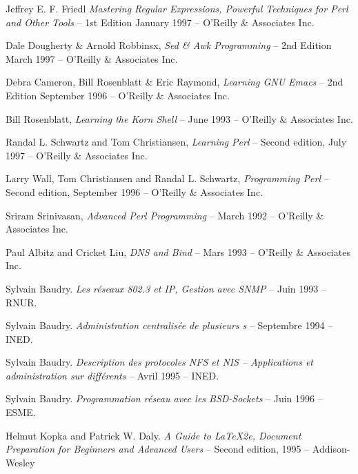 \begin{thebibliography}{99}
	Jeffrey E. F. {\sc Friedl}
		\textsl{Mastering Regular Expressions,
				Powerful Techniques for Perl and Other Tools} --
		1st Edition January 1997 -- O'Reilly \& Associates Inc.

	Dale {\sc Dougherty} \& Arnold {\sc Robbinsx},
		\textsl{Sed \& Awk Programming} --
		2nd Edition March 1997 -- O'Reilly \& Associates Inc.

	Debra {\sc Cameron}, Bill {\sc Rosenblatt} \& Eric {\sc Raymond},
		\textsl{Learning GNU Emacs} --
		2nd Edition September 1996 -- O'Reilly \& Associates Inc.

	Bill {\sc Rosenblatt},
		\textsl{Learning the Korn Shell} --
		June 1993 -- O'Reilly \& Associates Inc.

	Randal L. {\sc Schwartz}  and Tom {\sc Christiansen},
		\textsl{Learning Perl} --
		Second edition, July 1997 -- O'Reilly \& Associates Inc.

	Larry {\sc Wall}, Tom {\sc Christiansen} and Randal L. {\sc Schwartz},
		\textsl{Programming Perl} --
		Second edition, September 1996 -- O'Reilly \& Associates Inc.

	Sriram {\sc Srinivasan},
		\textsl{Advanced Perl Programming} --
		March 1992 -- O'Reilly \& Associates Inc.

	Paul {\sc Albitz} and Cricket {\sc Liu},
		\textsl{DNS and Bind} --
		Mars 1993 -- O'Reilly \& Associates Inc.

	Sylvain {\sc Baudry}.
		\textsl{Les r{\'e}seaux 802.3 et IP, Gestion avec SNMP} --
		Juin 1993 -- RNUR.

	Sylvain {\sc Baudry}.
		\textsl{Administration centralis{\'e}e de plusieurs {\Unix}s} --
		Septembre 1994 -- INED.

	Sylvain {\sc Baudry}.
		\textsl{Description des protocoles NFS et NIS -- Applications et
			administration sur diff{\'e}rents {\Unix}} --
		Avril 1995 -- INED.

	Sylvain {\sc Baudry}.
		\textsl{Programmation r{\'e}seau avec les BSD-Sockets} --
		Juin 1996 -- ESME.

	Helmut {\sc Kopka} and Patrick W. {\sc Daly}.
		\textsl{A Guide to \LaTeX2e{}, Document Preparation for Beginners and Advanced Users} --
		Second edition, 1995 -- Addison-Wesley

\end{thebibliography}
